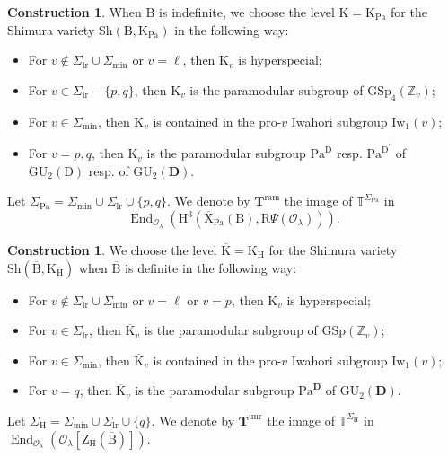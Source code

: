 \documentclass[10pt]{amsart}
\numberwithin{equation}{section}
\theoremstyle{definition}
\newtheorem{construction}[equation]{Construction}
\def\GSp{\mathrm{GSp}}
\def\GU{\mathrm{GU}}
\def\min{\mathrm{min}}
\def\lr{\mathrm{lr}}
\def\ram{\mathrm{ram}}
\def\Pa{\mathrm{Pa}}
\DeclareMathOperator{\End}{End}
\def\calO{\mathcal{O}}
\def\TT{\mathbb{T}}
\def\bfT{\mathbf{T}}
\def\ZZ{\mathbb{Z}}
\def\rmB{\mathrm{B}}
\def\rmD{\mathrm{D}}
\def\rmH{\mathrm{H}}
\def\rmK{\mathrm{K}}
\def\rmR{\mathrm{R}}
\def\rmX{\mathrm{X}}
\def\rmZ{\mathrm{Z}}
\def\Iw{\mathrm{Iw}}
\def\unr{\mathrm{unr}}
\def\Sh{\mathrm{Sh}}
\begin{document}
\begin{construction}\label{indef-level}
When $\rmB$ is indefinite, we choose the level $\rmK=\rmK_{\Pa}$ for the Shimura variety $\Sh(\rmB, \rmK_{\Pa})$ in the following way:
\begin{itemize}
\item For $v\not\in\Sigma_{\lr}\cup\Sigma_{\min}$ or $v=\ell$, then $\rmK_{v}$ is hyperspecial;
\item For $v\in\Sigma_{\lr}-\{p, q\}$, then $\rmK_{v}$ is the paramodular subgroup of $\GSp_{4}(\ZZ_{v})$;
\item For $v\in\Sigma_{\min}$, then $\rmK_{v}$ is contained in the pro-$v$ Iwahori subgroup $\Iw_{1}(v)$;
\item For $v=p, q$, then  $\rmK_{v}$ is the paramodular subgroup $\Pa^{\rmD}$ resp. $\Pa^{\rmD^{\prime }}$ of $\GU_{2}(\rmD)$ resp. of $\GU_{2}(\mathbf{D})$.
\end{itemize}

Let $\Sigma_{\Pa}=\Sigma_{\min}\cup\Sigma_{\lr}\cup\{p, q\}$. We denote by $\bfT^{\ram}$ the image of $\TT^{\Sigma_{\Pa}}$ in 
\begin{equation*}
\End_{\calO_{\lambda}}(\rmH^{3}(\overline{\rmX}_{\Pa}(\rmB), \rmR\Psi(\calO_{\lambda}))).
\end{equation*}
\end{construction}
\begin{construction}\label{def-level}
We choose the level $\overline{\rmK}=\rmK_{\rmH}$ for the Shimura variety $\Sh(\overline{\rmB}, \rmK_{\rmH})$ when $\overline{\rmB}$ is definite in the following way:
\begin{itemize}
\item For $v\not\in\Sigma_{\lr}\cup\Sigma_{\min}$ or $v=\ell$ or $v=p$, then $\overline{\rmK}_{v}$ is hyperspecial;
\item For $v\in\Sigma_{\lr}$, then $\overline{\rmK}_{v}$ is the paramodular subgroup of $\GSp(\ZZ_{v})$;
\item  For $v\in\Sigma_{\min}$, then $\overline{\rmK}_{v}$ is contained in the pro-$v$ Iwahori subgroup $\Iw_{1}(v)$;
\item For $v=q$, then  $\overline{\rmK}_{v}$ is the paramodular subgroup $\Pa^{\mathbf{D}}$ of $\GU_{2}(\mathbf{D})$.
\end{itemize}
Let $\Sigma_{\rmH}=\Sigma_{\min}\cup\Sigma_{\lr}\cup\{q\}$. We denote by $\bfT^{\unr}$ the image of $\TT^{\Sigma_{\rmH}}$ in 
$\End_{\calO_{\lambda}}(\calO_{\lambda}[\rmZ_{\rmH}(\overline{\rmB})])$. 
\end{construction}
\end{document}
